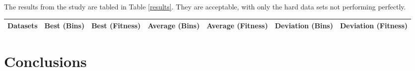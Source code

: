 \documentclass[conference]{IEEEtran}
\begin{document}
\label{results}
The results from the study are tabled in Table \ref{results}. They are acceptable, with only the hard data sets not performing perfectly.\\

\begin{table*}[t!]
\centering
\renewcommand{\arraystretch}{1.3}
\caption{Best Result, Average Result and Standard Deviation over 10 Runs of Each Dataset}
\label{results}
\begin{tabular}{c|c|c|c|c|c|c}
 Datasets & Best (Bins) & Best (Fitness) & Average (Bins) & Average (Fitness) & Deviation (Bins) & Deviation (Fitness) \\
\hline

\hline

\end{tabular}
\end{table*}


\section{Conclusions}
\label{conclusions}





\end{document}
